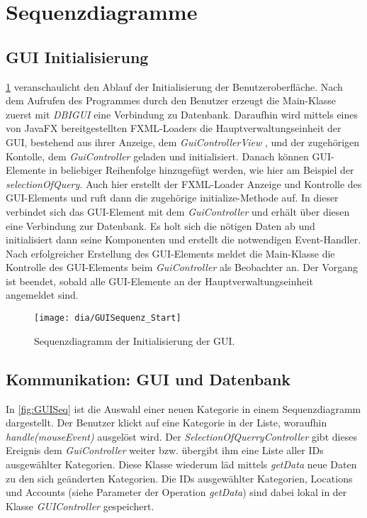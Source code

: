 \section{Sequenzdiagramme}
\subsection{GUI Initialisierung}

\cref{fig:GUIStartSeq} veranschaulicht den Ablauf der Initialisierung der Benutzeroberfläche. Nach dem Aufrufen des Programmes durch den Benutzer erzeugt die Main-Klasse zuerst mit \emph{DBIGUI} eine Verbindung zu Datenbank.
Daraufhin wird mittels eines von JavaFX bereitgestellten FXML-Loaders die Hauptverwaltungseinheit der GUI, bestehend aus ihrer Anzeige, dem \emph{GuiControllerView} , und der zugehörigen Kontolle, dem \emph{GuiController} geladen und initialisiert.
Danach können GUI-Elemente in beliebiger Reihenfolge hinzugefügt werden, wie hier am Beispiel der \emph{selectionOfQuery}.
Auch hier erstellt der FXML-Loader Anzeige und Kontrolle des GUI-Elements und ruft dann die zugehörige initialize-Methode auf.
In dieser verbindet sich das GUI-Element mit dem \emph{GuiController} und erhält über diesen eine Verbindung zur Datenbank. Es holt sich die nötigen Daten ab und initialisiert dann seine Komponenten und erstellt die notwendigen Event-Handler.
Nach erfolgreicher Erstellung des GUI-Elements meldet die  Main-Klasse die Kontrolle des GUI-Elements beim \emph{GuiController} als Beobachter an.
Der Vorgang ist beendet, sobald alle GUI-Elemente an der Hauptverwaltungseinheit angemeldet sind.

\begin{figure}[h!]
	\centering
	\texttt{[image: dia/GUISequenz\_Start]}
	\caption{Sequenzdiagramm der Initialisierung der GUI.}
	\label{fig:GUIStartSeq}
\end{figure}
\subsection{Kommunikation: GUI und Datenbank}
In \cref{fig:GUISeq} ist die Auswahl einer neuen Kategorie in einem Sequenzdiagramm dargestellt. Der Benutzer klickt auf eine Kategorie in der Liste, woraufhin \emph{handle(mouseEvent)} ausgelöst wird. Der \emph{SelectionOfQuerryController} gibt dieses Ereignis dem \emph{GuiController} weiter bzw. übergibt ihm eine Liste aller IDs ausgewählter Kategorien. Diese Klasse wiederum läd mittels \emph{getData} neue Daten zu den sich geänderten Kategorien. Die IDs ausgewählter Kategorien, Locations und Accounts (siehe Parameter der Operation \emph{getData}) sind dabei lokal in der Klasse \emph{GUIController} gespeichert.

